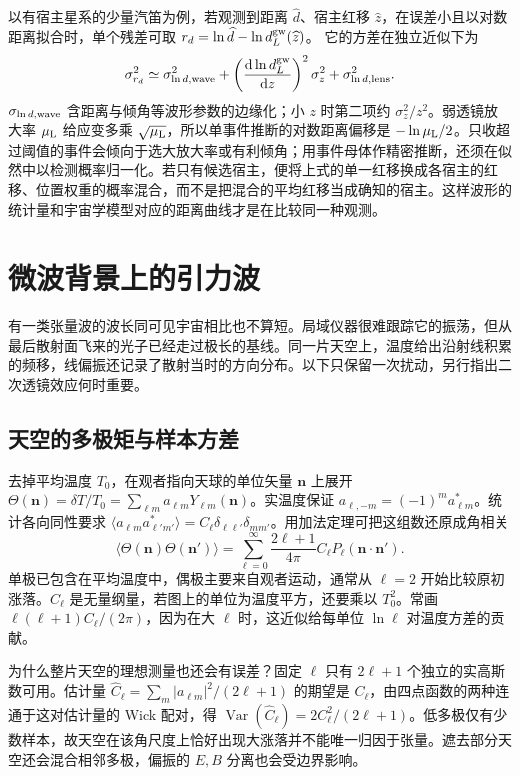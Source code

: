 以有宿主星系的少量汽笛为例，若观测到距离 $\widehat d$、宿主红移 $\widehat z$，在误差小且以对数距离拟合时，单个残差可取 $r_d=\ln\widehat d-\ln d_L^{\rm gw}(\widehat z)$。 它的方差在独立近似下为
\[
 \sigma_{r_d}^2\simeq\sigma_{\ln d,{\rm wave}}^2
 +\left(\frac{\mathrm d\ln d_L^{\rm gw}}{\mathrm dz}\right)^2
    \sigma_z^2+\sigma_{\ln d,{\rm lens}}^2 .
\]
$\sigma_{\ln d,{\rm wave}}$ 含距离与倾角等波形参数的边缘化；小 $z$ 时第二项约 $\sigma_z^2/z^2$。弱透镜放大率 $\mu_{\rm L}$ 给应变多乘 $\sqrt{\mu_{\rm L}}$，所以单事件推断的对数距离偏移是 $-\ln\mu_{\rm L}/2$。只收超过阈值的事件会倾向于选大放大率或有利倾角；用事件母体作精密推断，还须在似然中以检测概率归一化。若只有候选宿主，便将上式的单一红移换成各宿主的红移、位置权重的概率混合，而不是把混合的平均红移当成确知的宿主。这样波形的统计量和宇宙学模型对应的距离曲线才是在比较同一种观测。
\section{微波背景上的引力波}\label{sec:gw-dcmb}

有一类张量波的波长同可见宇宙相比也不算短。局域仪器很难跟踪它的振荡，但从最后散射面飞来的光子已经走过极长的基线。同一片天空上，温度给出沿射线积累的频移，线偏振还记录了散射当时的方向分布。以下只保留一次扰动，另行指出二次透镜效应何时重要。

\subsection{天空的多极矩与样本方差}

去掉平均温度 $T_0$，在观者指向天球的单位矢量 $\bm n$ 上展开 $\Theta(\bm n)=\delta T/T_0=\sum_{\ell m}a_{\ell m}Y_{\ell m}(\bm n)$。实温度保证 $a_{\ell,-m}=(-1)^ma_{\ell m}^*$。统计各向同性要求 $\langle a_{\ell m}a^*_{\ell'm'}\rangle=C_\ell\delta_{\ell\ell'}\delta_{mm'}$。用加法定理可把这组数还原成角相关
\[
 \langle\Theta(\bm n)\Theta(\bm n')\rangle
 =\sum_{\ell=0}^{\infty}\frac{2\ell+1}{4\pi}C_\ell P_\ell(\bm n\cdot\bm n').
\]
单极已包含在平均温度中，偶极主要来自观者运动，通常从 $\ell=2$ 开始比较原初涨落。$C_\ell$ 是无量纲量，若图上的单位为温度平方，还要乘以 $T_0^2$。常画 $\ell(\ell+1)C_\ell/(2\pi)$，因为在大 $\ell$ 时，这近似给每单位 $\ln\ell$ 对温度方差的贡献。

为什么整片天空的理想测量也还会有误差？固定 $\ell$ 只有 $2\ell+1$ 个独立的实高斯数可用。估计量 $\widehat C_\ell=\sum_m|a_{\ell m}|^2/(2\ell+1)$ 的期望是 $C_\ell$，由四点函数的两种连通于这对估计量的 Wick 配对，得 $\operatorname{Var}(\widehat C_\ell)=2C_\ell^2/(2\ell+1)$。低多极仅有少数样本，故天空在该角尺度上恰好出现大涨落并不能唯一归因于张量。遮去部分天空还会混合相邻多极，偏振的 $E,B$ 分离也会受边界影响。

